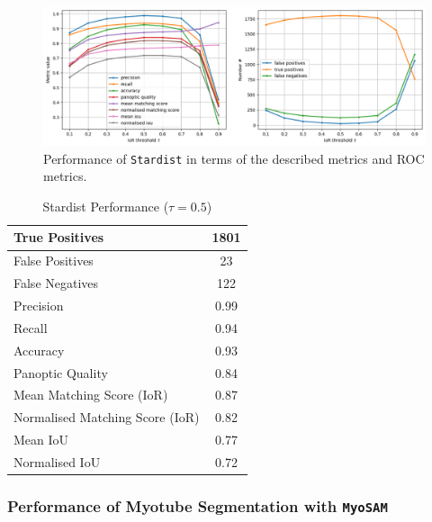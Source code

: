 \begin{figure}
	\centering
	\includegraphics[width=\textwidth]{"images/quantitative_performance_stardist.png"}
	\caption[Quantitative performance \texttt{Stardist}]{Performance of \texttt{Stardist} in terms of the described metrics and ROC metrics.}
	\label{figperfstardist}
\end{figure} 

\begin{table}[H]
	\centering
	\caption{Stardist Performance ($\tau = 0.5$)}
	\begin{tabular}{|l|c|}
		\hline
		True Positives & 1801 \\
		\hline
		False Positives & 23 \\
		\hline
		False Negatives & 122 \\
		\hline
		Precision & 0.99 \\
		\hline
		Recall & 0.94 \\
		\hline
		Accuracy & 0.93 \\
		\hline
		Panoptic Quality & 0.84 \\
		\hline
		Mean Matching Score (IoR) & 0.87 \\
		\hline
		Normalised Matching Score (IoR) & 0.82 \\
		\hline
		Mean IoU & 0.77 \\
		\hline
		Normalised IoU & 0.72 \\
		\hline
	\end{tabular}
\end{table}

\subsubsection{Performance of Myotube Segmentation with \texttt{MyoSAM}}

